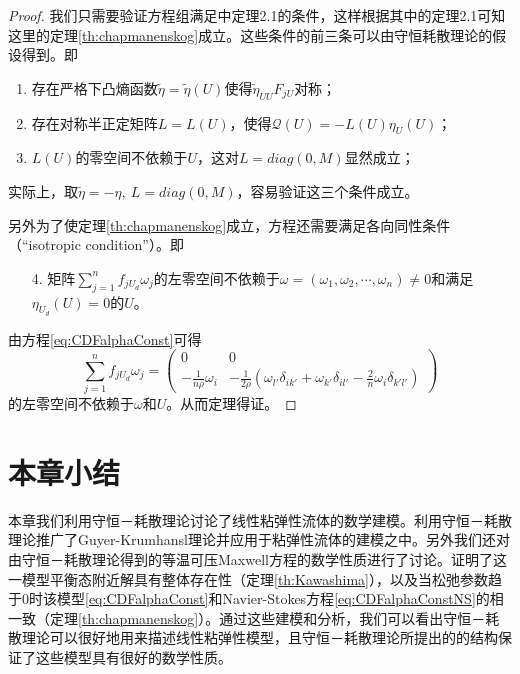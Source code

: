 	\begin{proof}
		我们只需要验证方程组满足\cite{yang2015validity}中定理2.1的条件，这样根据其中的定理2.1可知这里的定理\ref{th:chapmanenskog}成立。这些条件的前三条可以由守恒耗散理论的假设得到。即
		\begin{enumerate}
			\item 	存在严格下凸熵函数$\tilde{\eta} = \tilde{\eta}(U)$使得$\tilde{\eta}_{UU} F_{jU}$对称；%
			\item 	存在对称半正定矩阵$L=L(U)$，使得$\mathcal{Q}(U) = -L(U) \eta_{U}(U)$；%
			\item   $L(U)$的零空间不依赖于$U$，这对$L = diag(0,M)$显然成立；
		\end{enumerate}
		实际上，取$\tilde{\eta} = - \eta,\ L = diag(0,M)$，容易验证这三个条件成立。
		
		另外为了使定理\ref{th:chapmanenskog}成立，方程还需要满足各向同性条件（“isotropic condition”）。即
		\begin{enumerate}
			\item[4.]矩阵$\sum_{j=1}^n f_{jU_d} \omega_j$的左零空间不依赖于$\omega = (\omega_1,\omega_2,\cdots,\omega_n) \neq 0$和满足$\eta_{U_d}(U)=0$的$U$。
		\end{enumerate}
		由方程\eqref{eq:CDFalphaConst}可得
		\begin{equation*}
			\sum_{j=1}^n f_{jU_d} \omega_j = \left( \begin{matrix}
				0 & 0 \\
				-\frac{1}{n \rho} \omega_i & -\frac{1}{2 \rho} (\omega_{l'} \delta_{ik'} + \omega_{k'} \delta_{il'} - \frac{2}{n} \omega_i \delta_{k'l'})
			\end{matrix}
			\right)
		\end{equation*}
		的左零空间不依赖于$\omega$和$U$。从而定理得证。
	\end{proof}
	\section{本章小结}
	本章我们利用守恒－耗散理论讨论了线性粘弹性流体的数学建模。利用守恒－耗散理论推广了Guyer-Krumhansl理论并应用于粘弹性流体的建模之中。另外我们还对由守恒－耗散理论得到的等温可压Maxwell方程的数学性质进行了讨论。证明了这一模型平衡态附近解具有整体存在性（定理\ref{th:Kawashima}），以及当松弛参数趋于$0$时该模型\eqref{eq:CDFalphaConst}和Navier-Stokes方程\eqref{eq:CDFalphaConstNS}的相一致（定理\ref{th:chapmanenskog}）。通过这些建模和分析，我们可以看出守恒－耗散理论可以很好地用来描述线性粘弹性模型，且守恒－耗散理论所提出的的结构保证了这些模型具有很好的数学性质。


